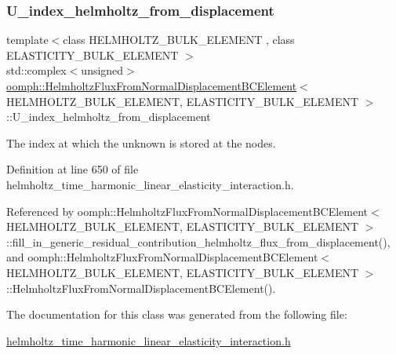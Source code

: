 \mbox{\label{classoomph_1_1HelmholtzFluxFromNormalDisplacementBCElement_a84343ef8842d932061e696fdbd032590}} 
\subsubsection{\texorpdfstring{U\+\_\+index\+\_\+helmholtz\+\_\+from\+\_\+displacement}{U\_index\_helmholtz\_from\_displacement}}
{\footnotesize\ttfamily template$<$class H\+E\+L\+M\+H\+O\+L\+T\+Z\+\_\+\+B\+U\+L\+K\+\_\+\+E\+L\+E\+M\+E\+NT , class E\+L\+A\+S\+T\+I\+C\+I\+T\+Y\+\_\+\+B\+U\+L\+K\+\_\+\+E\+L\+E\+M\+E\+NT $>$ \\
std\+::complex$<$unsigned$>$ \hyperlink{classoomph_1_1HelmholtzFluxFromNormalDisplacementBCElement}{oomph\+::\+Helmholtz\+Flux\+From\+Normal\+Displacement\+B\+C\+Element}$<$ H\+E\+L\+M\+H\+O\+L\+T\+Z\+\_\+\+B\+U\+L\+K\+\_\+\+E\+L\+E\+M\+E\+NT, E\+L\+A\+S\+T\+I\+C\+I\+T\+Y\+\_\+\+B\+U\+L\+K\+\_\+\+E\+L\+E\+M\+E\+NT $>$\+::U\+\_\+index\+\_\+helmholtz\+\_\+from\+\_\+displacement\hspace{0.3cm}{\ttfamily [private]}}



The index at which the unknown is stored at the nodes. 



Definition at line 650 of file helmholtz\+\_\+time\+\_\+harmonic\+\_\+linear\+\_\+elasticity\+\_\+interaction.\+h.



Referenced by oomph\+::\+Helmholtz\+Flux\+From\+Normal\+Displacement\+B\+C\+Element$<$ H\+E\+L\+M\+H\+O\+L\+T\+Z\+\_\+\+B\+U\+L\+K\+\_\+\+E\+L\+E\+M\+E\+N\+T, E\+L\+A\+S\+T\+I\+C\+I\+T\+Y\+\_\+\+B\+U\+L\+K\+\_\+\+E\+L\+E\+M\+E\+N\+T $>$\+::fill\+\_\+in\+\_\+generic\+\_\+residual\+\_\+contribution\+\_\+helmholtz\+\_\+flux\+\_\+from\+\_\+displacement(), and oomph\+::\+Helmholtz\+Flux\+From\+Normal\+Displacement\+B\+C\+Element$<$ H\+E\+L\+M\+H\+O\+L\+T\+Z\+\_\+\+B\+U\+L\+K\+\_\+\+E\+L\+E\+M\+E\+N\+T, E\+L\+A\+S\+T\+I\+C\+I\+T\+Y\+\_\+\+B\+U\+L\+K\+\_\+\+E\+L\+E\+M\+E\+N\+T $>$\+::\+Helmholtz\+Flux\+From\+Normal\+Displacement\+B\+C\+Element().



The documentation for this class was generated from the following file\+:\begin{DoxyCompactItemize}
\item 
\hyperlink{helmholtz__time__harmonic__linear__elasticity__interaction_8h}{helmholtz\+\_\+time\+\_\+harmonic\+\_\+linear\+\_\+elasticity\+\_\+interaction.\+h}\end{DoxyCompactItemize}
